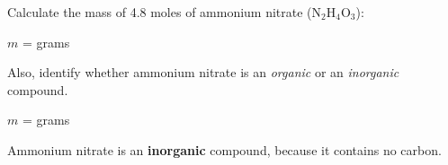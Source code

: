 

Calculate the mass of 4.8 moles of ammonium nitrate (N$_{2}$H$_{4}$O$_{3}$):

\vskip 10pt

$m$ = \underbar{\hskip 50pt} grams

\vskip 10pt

Also, identify whether ammonium nitrate is an {\it organic} or an {\it inorganic} compound.







$m$ =  grams
 
\vskip 10pt

Ammonium nitrate is an {\bf inorganic} compound, because it contains no carbon.











